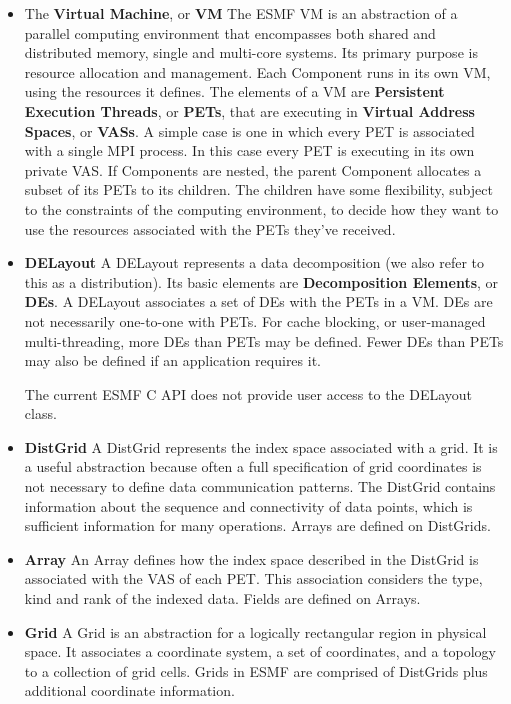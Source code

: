\begin{itemize}

\item The {\bf Virtual Machine}, or {\bf VM} The ESMF VM is an 
abstraction of a parallel computing environment that encompasses 
both shared and distributed memory, single and multi-core systems.
Its primary purpose is resource allocation and management. Each Component
runs in its own VM, using the resources it defines. The elements of a VM
are {\bf Persistent Execution Threads}, or {\bf PETs}, that are
executing in {\bf Virtual Address Spaces}, or {\bf VASs}. A simple
case is one in which every PET is associated with a single MPI process.
In this case every PET is executing in its own private VAS. If Components
are nested, the parent Component allocates a subset of its PETs to its
children. The children have some flexibility, subject to the constraints of
the computing environment, to decide how they want to use the
resources associated with the PETs they've received.

\item {\bf DELayout}  A DELayout represents a data decomposition
(we also refer to this as a distribution).  Its
basic elements are {\bf Decomposition Elements}, or {\bf DEs}.  
A DELayout associates a set of DEs with the PETs in a VM.  DEs are not
necessarily one-to-one with PETs.  For cache blocking,
or user-managed multi-threading, more DEs than PETs may be defined.
Fewer DEs than PETs may also be defined if an application requires it.

The current ESMF C API does not provide user access to the DELayout class.

\item {\bf DistGrid}  A DistGrid represents the index space
associated with a grid.  It is a useful abstraction because
often a full specification of grid coordinates is not necessary
to define data communication patterns.  The DistGrid contains
information about the sequence and connectivity of data points,
which is sufficient information for many operations.  Arrays
are defined on DistGrids.

\item {\bf Array} An Array defines how the index space described
in the DistGrid is associated with the VAS of each PET. This association
considers the type, kind and rank of the indexed data. Fields are
defined on Arrays.

\item {\bf Grid}  A Grid is an abstraction for a logically rectangular
region in physical space.  It associates a coordinate system, a set of
coordinates, and a topology to a collection of grid cells.  Grids in ESMF
are comprised of DistGrids plus additional coordinate information.


\end{itemize}
